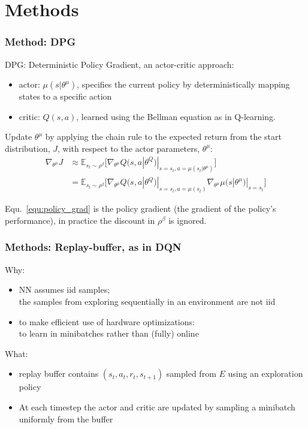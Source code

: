 \section{Methods}

\begin{frame}
\frametitle{Method: DPG \cite{Silver2014}}

DPG: Deterministic Policy Gradient, an actor-critic approach:
\begin{itemize}
  \item actor: $\mu (s|\theta^{\mu})$,
  specifies the current policy by deterministically mapping states to a specific action
  \item critic: $Q(s, a)$,
  learned using the Bellman equation as in Q-learning.
\end{itemize}

Update $\theta^{\mu}$ by applying the chain rule to the expected return from
the start distribution, $J$, with respect to the actor parameters, $\theta^{\mu}$:
\begin{equation} \label{equ:policy_grad}
\begin{split}
\nabla_{\theta^{\mu}} J &  \approx \mathbb{E}_{s_t \sim \rho^{\beta}} \Big[ \nabla_{\theta^{\mu}} Q(s,a|\theta^Q) |_{s = s_t, a = \mu(s_t|\theta^{\mu})} \Big] \\
  & = \mathbb{E}_{s_t \sim \rho^{\beta}} \Big[ \nabla_{\theta^{\mu}} Q(s,a|\theta^Q) |_{s = s_t, a = \mu(s_t)} \nabla_{\theta^{\mu}} \mu(s|\theta^{\mu})|_{s = s_t} \Big]
\end{split}
\end{equation}

Equ.~\ref{equ:policy_grad} is the policy gradient (the gradient of the policy's performance),
in practice the discount in $\rho^{\beta}$ is ignored.
\end{frame}

\begin{frame}
\frametitle{Methods: Replay-buffer, as in DQN~\cite{Mnih2013}}
Why:
\begin{itemize}
\item NN assumes iid samples;\\
the samples from exploring sequentially in an environment are not iid
\item to make efficient use of hardware optimizations:\\
to learn in minibatches rather than (fully) online
\end{itemize}
\vspace{5mm}

What:
\begin{itemize}
  \item replay buffer contains $(s_t, a_t, r_t, s_{t+1})$ sampled from $E$ using an exploration policy
  \item At each timestep the actor and critic are updated by sampling a minibatch uniformly from the buffer
\end{itemize}

\end{frame}

